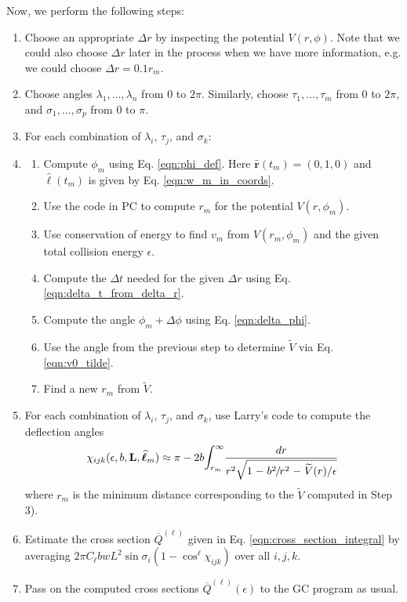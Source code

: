 \documentclass[article]{revtex4-2}
\begin{document}
Now, we perform the following steps:
\begin{enumerate}
    \item Choose an appropriate $\Delta r$ by inspecting the potential $V(r, \phi)$. Note that we could also choose $\Delta r$ later in the process when we have more information, e.g. we could choose $\Delta r = 0.1r_m$.
    \item Choose angles $\lambda_1, \ldots, \lambda_n$ from $0$ to $2\pi$. Similarly, choose $\tau_1, \dots, \tau_m$ from $0$ to $2\pi$, and $\sigma_1,\ldots,\sigma_p$ from $0$ to $\pi$.
    \item For each combination of $\lambda_i$, $\tau_j$, and $\sigma_k$:
    \item[] \begin{enumerate}
        \item [a)] Compute $\phi_m$ using Eq. \ref{eqn:phi_def}. Here $\mathbf{\widehat{r}}(t_m)=(0,1,0)$ and $\widehat{\boldsymbol{\ell}}(t_m)$ is given by Eq. \ref{eqn:w_m_in_coords}.
        \item [b)] Use the code in PC to compute $r_m$ for the potential $V(r, \phi_m)$.
        \item [c)] Use conservation of energy to find $v_m$ from $V(r_m, \phi_m)$ and the given total collision energy $\epsilon$.
        \item [d)] Compute the $\Delta t$ needed for the given $\Delta r$ using Eq. \ref{eqn:delta_t_from_delta_r}.
        \item [e)] Compute the angle $\phi_m + \Delta \phi$ using Eq. \ref{eqn:delta_phi}.
        \item[f)] Use the angle from the previous step to determine $\widetilde{V}$ via Eq. \ref{eqn:v0_tilde}.
        \item [g)] Find a new $r_m$ from $\widetilde{V}$.
    \end{enumerate}
    \item For each combination of $\lambda_i$, $\tau_j$, and $\sigma_k$, use Larry's code to compute the deflection angles 
    \begin{equation}
        \chi_{ijk}(\epsilon, b, \mathbf{L}, \widehat{\boldsymbol{\ell}}_m) \approx \pi - 2b \mathlarger{\int}_{r_m}^{\infty} \frac{dr}{r^2\sqrt{1 \mkern1mu - \mkern1mu  b^2 \mkern-2mu/\mkern-2mu r^2 \mkern1mu - \mkern1mu \widetilde{V}(r)/\epsilon}}
        \label{eqn:chi_integral}
    \end{equation}
    where $r_m$ is the minimum distance corresponding to the $\widetilde{V}$ computed in Step 3).
    \item Estimate the cross section $\overline{Q}^{(\ell)}$ given in Eq. \ref{eqn:cross_section_integral} by averaging $2\pi C_\ell b w L^2 \sin \sigma_i (1 - \cos^\ell \chi_{ijk})$ over all $i,j,k$.
    \item Pass on the computed cross sections $\overline{Q}^{(\ell)}(\epsilon)$ to the GC program as usual.
\end{enumerate}
\end{document}
